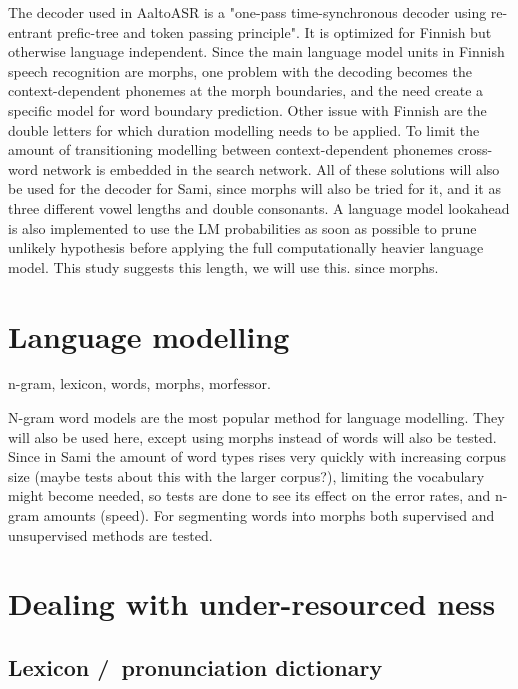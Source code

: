 \documentclass[10pt,b5paper]{article}
\begin{document}
The decoder used in AaltoASR is a "one-pass time-synchronous decoder using re-entrant prefic-tree and token passing principle". It is optimized for Finnish but otherwise language independent. Since the main language model units in Finnish speech recognition are morphs, one problem with the decoding becomes the context-dependent phonemes at the morph boundaries, and the need create a specific model for word boundary prediction. Other issue with Finnish are the double letters for which duration modelling needs to be applied. To limit the amount of transitioning modelling between context-dependent phonemes cross-word network is embedded in the search network. \cite{pylkkonen2013towards}\cite{hirsimaki2009importance}\cite{hirsimaki2006unlimited} All of these solutions will also be used for the decoder for Sami, since morphs will also be tried for it, and it as three different vowel lengths and double consonants. A language model lookahead is also implemented to use the LM probabilities as soon as possible to prune unlikely hypothesis before applying the full computationally heavier language model. This study suggests this length, we will use this. since morphs.

\section{Language modelling}

n-gram, lexicon, words, morphs, morfessor. 

N-gram word models are the most popular method for language modelling. They will also be used here, except using morphs instead of words will also be tested. Since in Sami the amount of word types rises very quickly with increasing corpus size (maybe tests about this with the larger corpus?), limiting the vocabulary might become needed, so tests are done to see its effect on the error rates, and n-gram amounts (speed). For segmenting words into morphs both supervised and unsupervised methods are tested.



\section{Dealing with under-resourced ness}

\subsection{Lexicon /\ pronunciation dictionary}
\end{document}
